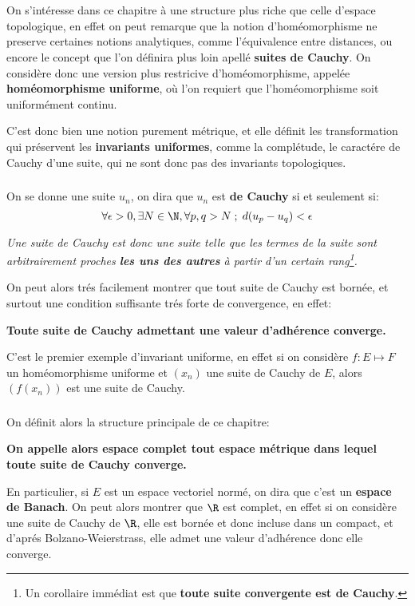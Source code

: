 \chapter*{}
On s'intéresse dans ce chapitre à une structure plus riche que celle d'espace topologique, en effet on peut remarque que la notion d'homéomorphisme ne preserve certaines notions analytiques, comme l'équivalence entre distances, ou encore le concept que l'on définira plus loin apellé \textbf{suites de Cauchy}. On considère donc une version plus restricive d'homéomorphisme, appelée \textbf{homéomorphisme uniforme}, où l'on requiert que l'homéomorphisme soit uniformément continu.\<

C'est donc bien une notion purement métrique, et elle définit les transformation qui préservent les \textbf{invariants uniformes}, comme la complétude, le caractére de Cauchy d'une suite, qui ne sont donc pas des invariants topologiques.

\subsection*{}
On se donne une suite \(u_n\), on dira que \(u_n\) est \textbf{de Cauchy} si et seulement si:
\[
   \forall \epsilon > 0 , \exists N \in \N , \forall p, q > N \; ; \; d(u_p - u_q) < \epsilon
\] 
\begin{center}
   \textit{
       Une suite de Cauchy est donc une suite telle que les termes de la suite sont arbitrairement proches \textbf{les uns des autres} à partir d'un certain rang\footnote[1]{Un corollaire immédiat est que \textbf{toute suite convergente est de Cauchy}.}.
   }
\end{center}
On peut alors trés facilement montrer que tout suite de Cauchy est bornée, et surtout une condition suffisante trés forte de convergence, en effet:
\begin{center}
   \textbf{Toute suite de Cauchy admettant une valeur d'adhérence converge.}
\end{center}
C'est le premier exemple d'invariant uniforme, en effet si on considère \( f : E \longmapsto F \) un homéomorphisme uniforme et \( (x_n) \) une suite de Cauchy de \( E \), alors \( (f(x_n)) \) est une suite de Cauchy.
\subsection*{}
On définit alors la structure principale de ce chapitre:
\begin{center}
   \textbf{On appelle alors espace complet tout espace métrique dans lequel toute suite de Cauchy converge.}
\end{center}
En particulier, si \( E \) est un espace vectoriel normé, on dira que c'est un \textbf{espace de Banach}. On peut alors montrer que \( \R \) est complet, en effet si on considère une suite de Cauchy de \( \R \), elle est bornée et donc incluse dans un compact, et d'aprés Bolzano-Weierstrass, elle admet une valeur d'adhérence donc elle converge.\<

